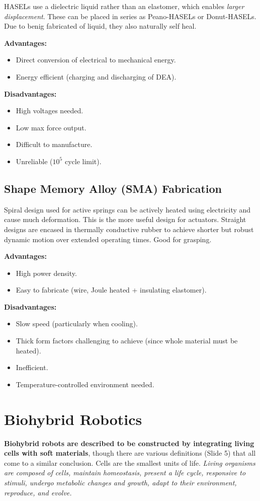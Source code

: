 \documentclass[onecolumn,a4paper]{article}
\begin{document}
HASELs use a dielectric liquid rather than an elastomer, which enables \emph{larger displacement}. These can be placed in series as Peano-HASELs or Donut-HASELs. Due to benig fabricated of liquid, they also naturally self heal.

\textbf{Advantages:}
\begin{itemize}
    \item Direct conversion of electrical to mechanical energy.
    \item Energy efficient (charging and discharging of DEA).
\end{itemize}
\textbf{Disadvantages:}
\begin{itemize}
    \item High voltages needed.
    \item Low max force output.
    \item Difficult to manufacture.
    \item Unreliable ($10^5$ cycle limit).
\end{itemize}

\subsection{Shape Memory Alloy (SMA) Fabrication}

Spiral design used for active springs can be actively heated using electricity and cause much deformation. This is the more useful design for actuators. Straight designs are encased in thermally conductive rubber to achieve shorter but robust dynamic motion over extended operating times. Good for grasping.

\textbf{Advantages:}
\begin{itemize}
    \item High power density.
    \item Easy to fabricate (wire, Joule heated + insulating elastomer).
\end{itemize}
\textbf{Disadvantages:}
\begin{itemize}
    \item Slow speed (particularly when cooling).
    \item Thick form factors challenging to achieve (since whole material must be heated).
    \item Inefficient.
    \item Temperature-controlled environment needed.
\end{itemize}

\section{Biohybrid Robotics}
\label{sec::bioh}
\textbf{Biohybrid robots are described to be constructed by integrating living cells with soft materials}, though there are various definitions (Slide 5) that all come to a similar conclusion. Cells are the smallest units of life. \emph{Living organisms are composed of cells, maintain homeostasis, present a life cycle, responsive to stimuli, undergo metabolic changes and growth, adapt to their environment, reproduce, and evolve.} 
\end{document}
